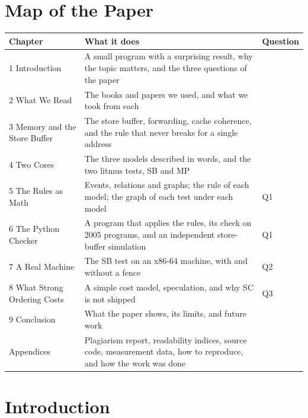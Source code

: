 \tableofcontents
\listoffigures
\listoftables

\chapter*{Map of the Paper}
\begin{center}\small
\begin{tabularx}{\textwidth}{@{}lXl@{}}
\toprule
Chapter & What it does & Question\\
\midrule
1 Introduction & A small program with a surprising result, why the topic matters, and the three questions of the paper & \\
2 What We Read & The books and papers we used, and what we took from each & \\
3 Memory and the Store Buffer & The store buffer, forwarding, cache coherence, and the rule that never breaks for a single address & \\
4 Two Cores & The three models described in words, and the two litmus tests, SB and MP & \\
5 The Rules as Math & Events, relations and graphs; the rule of each model; the graph of each test under each model & Q1\\
6 The Python Checker & A program that applies the rules, its check on 2005 programs, and an independent store-buffer simulation & Q1\\
7 A Real Machine & The SB test on an x86-64 machine, with and without a fence & Q2\\
8 What Strong Ordering Costs & A simple cost model, speculation, and why SC is not shipped & Q3\\
9 Conclusion & What the paper shows, its limits, and future work & \\
\midrule
Appendices & Plagiarism report, readability indices, source code, measurement data, how to reproduce, and how the work was done & \\
\bottomrule
\end{tabularx}
\end{center}
\clearpage

\chapter{Introduction}
\label{ch:intro}

